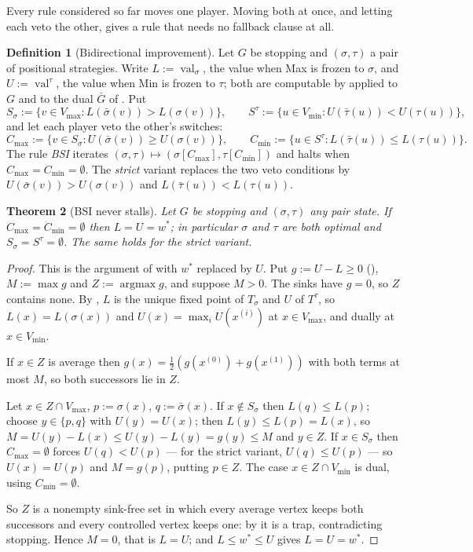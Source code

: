\documentclass[11pt]{article}
\theoremstyle{plain}
\newtheorem{theorem}{Theorem}[section]
\theoremstyle{definition}
\newtheorem{definition}[theorem]{Definition}
\DeclareMathOperator{\val}{val}
\newcommand{\Vmax}{V_{\max}}
\newcommand{\Vmin}{V_{\min}}
\begin{document}
Every rule considered so far moves one player. Moving both at once, and
letting each veto the other, gives a rule that needs no fallback clause at
all.

\begin{definition}[Bidirectional improvement]\label{def:bsi}
Let $G$ be stopping and $(\sigma,\tau)$ a pair of positional strategies.
Write $L:=\val_\sigma$, the value when Max is frozen to $\sigma$, and
$U:=\val^\tau$, the value when Min is frozen to $\tau$; both are computable
by  applied to $G$ and to the dual $\bar G$ of
. Put
\[
  S_\sigma:=\{v\in\Vmax: L(\bar\sigma(v))>L(\sigma(v))\},\qquad
  S^\tau:=\{u\in\Vmin: U(\bar\tau(u))<U(\tau(u))\},
\]
and let each player veto the other's switches:
\[
  C_{\max}:=\{v\in S_\sigma: U(\bar\sigma(v))\ge U(\sigma(v))\},\qquad
  C_{\min}:=\{u\in S^\tau: L(\bar\tau(u))\le L(\tau(u))\}.
\]
The rule \emph{BSI} iterates
$(\sigma,\tau)\mapsto(\sigma[C_{\max}],\tau[C_{\min}])$ and halts when
$C_{\max}=C_{\min}=\emptyset$. The \emph{strict} variant replaces the two
veto conditions by $U(\bar\sigma(v))>U(\sigma(v))$ and
$L(\bar\tau(u))<L(\tau(u))$.
\end{definition}

\begin{theorem}[BSI never stalls]\label{thm:bsi-nostall}
Let $G$ be stopping and $(\sigma,\tau)$ any pair state. If
$C_{\max}=C_{\min}=\emptyset$ then $L=U=w^\ast$; in particular $\sigma$ and
$\tau$ are both optimal and $S_\sigma=S^\tau=\emptyset$. The same holds for
the strict variant.
\end{theorem}

\begin{proof}
This is the argument of  with $w^\ast$ replaced by
$U$. Put $g:=U-L\ge0$ (), $M:=\max g$ and
$Z:=\operatorname{argmax}g$, and suppose $M>0$. The sinks have $g=0$, so
$Z$ contains none. By , $L$ is the unique fixed point
of $T_\sigma$ and $U$ of $T^\tau$, so $L(x)=L(\sigma(x))$ and
$U(x)=\max_iU(x^{(i)})$ at $x\in\Vmax$, and dually at $x\in\Vmin$.

If $x\in Z$ is average then $g(x)=\tfrac12(g(x^{(0)})+g(x^{(1)}))$ with both
terms at most $M$, so both successors lie in $Z$.

Let $x\in Z\cap\Vmax$, $p:=\sigma(x)$, $q:=\bar\sigma(x)$. If
$x\notin S_\sigma$ then $L(q)\le L(p)$; choose $y\in\{p,q\}$ with
$U(y)=U(x)$; then $L(y)\le L(p)=L(x)$, so
$M=U(y)-L(x)\le U(y)-L(y)=g(y)\le M$ and $y\in Z$. If $x\in S_\sigma$ then
$C_{\max}=\emptyset$ forces $U(q)<U(p)$ --- for the strict variant,
$U(q)\le U(p)$ --- so $U(x)=U(p)$ and $M=g(p)$, putting $p\in Z$. The case
$x\in Z\cap\Vmin$ is dual, using $C_{\min}=\emptyset$.

So $Z$ is a nonempty sink-free set in which every average vertex keeps both
successors and every controlled vertex keeps one: by  it
is a trap, contradicting stopping. Hence $M=0$, that is $L=U$; and
$L\le w^\ast\le U$ gives $L=U=w^\ast$.
\end{proof}
\end{document}
